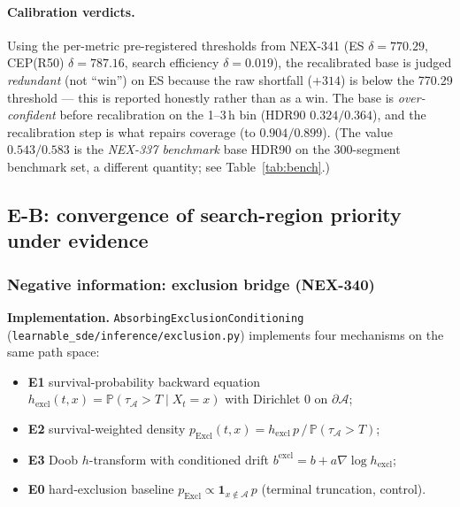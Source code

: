 \documentclass[11pt]{article}
\newcommand{\Aregion}{\mathcal{A}}
\newcommand{\ind}{\mathbf{1}}
\renewcommand{\P}[1]{\mathbb{P}\left(#1\right)}
\newcommand{\ExclName}{\texttt{AbsorbingExclusionConditioning}}
\begin{document}
\paragraph{Calibration verdicts.} Using the per-metric pre-registered
thresholds from NEX-341 (ES $\delta{=}770.29$, CEP(R50) $\delta{=}787.16$,
search efficiency $\delta{=}0.019$), the recalibrated base is judged
\emph{redundant} (not ``win'') on ES because the raw shortfall ($+314$) is
below the 770.29 threshold --- this is reported honestly rather than as a win.
The base is \emph{over-confident} before recalibration on the 1--3\,h bin
(HDR90 $0.324/0.364$), and the recalibration step is what repairs coverage
(to $0.904/0.899$).  (The value $0.543/0.583$ is the \emph{NEX-337 benchmark}
base HDR90 on the 300-segment benchmark set, a different quantity; see
Table~\ref{tab:bench}.)

\subsection{E-B: convergence of search-region priority under evidence}
\label{sec:exp-b}

\subsubsection{Negative information: exclusion bridge (NEX-340)}
\label{sec:exp-b-excl}

\textbf{Implementation.} \ExclName
(\texttt{learnable\_sde/inference/exclusion.py}) implements four mechanisms
on the same path space:
\begin{itemize}
\item \textbf{E1} survival-probability backward equation
$h_{\mathrm{excl}}(t,x)=\P{\tau_{\Aregion}>T\mid X_t=x}$ with Dirichlet $0$ on
$\partial \Aregion$;
\item \textbf{E2} survival-weighted density
$p_{\mathrm{Excl}}(t,x)=h_{\mathrm{excl}}\,p\,/\,\P{\tau_{\Aregion}>T}$;
\item \textbf{E3} Doob $h$-transform with conditioned drift
$b^{\mathrm{excl}}=b+a\nabla\log h_{\mathrm{excl}}$;
\item \textbf{E0} hard-exclusion baseline
$p_{\mathrm{Excl}}\propto\ind_{x\notin \Aregion}\,p$ (terminal truncation, control).
\end{itemize}
\end{document}
